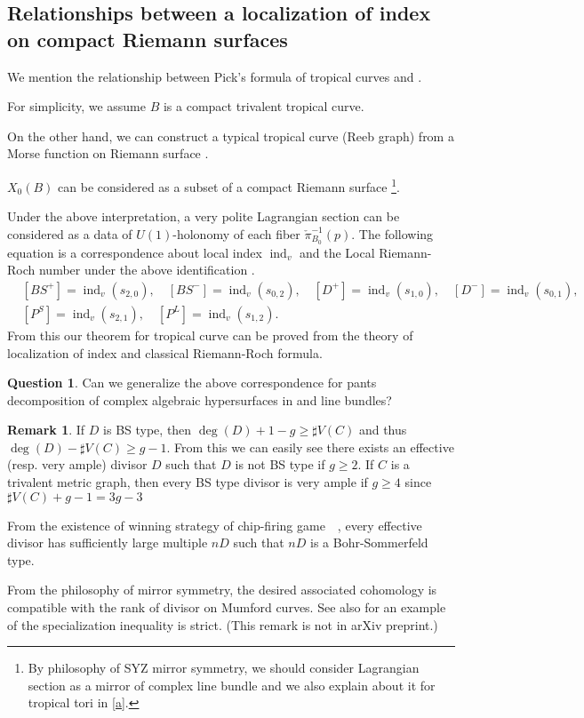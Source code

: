 \documentclass[a4paper,dvipdfmx,reqno,12pt]{amsart}
\theoremstyle{definition}
\newtheorem{Ques}[Thm]{Question}
\newtheorem{Rmk}[Thm]{Remark}
\newcommand{\opn}[1]{\operatorname{#1}}
\numberwithin{equation}{section}
\begin{document}
\subsection{Relationships between a localization of index on compact Riemann surfaces}
We mention the relationship between Pick's formula of tropical curves and
\cite[6]{MR2676658}.

For simplicity, we assume $B$ is a compact trivalent tropical curve.

On the other hand, we can construct a typical tropical curve
(Reeb graph) from a Morse function on Riemann surface
\cite[3.2.2]{kontsevichAffineStructuresNonArchimedean2006a}.

$X_0(B)$  can be considered as a subset of a compact Riemann surface
\footnote{By philosophy of SYZ mirror symmetry,
  we should consider Lagrangian section as a mirror of complex line bundle
  and we also explain about it for tropical tori in \cref{a}.
}.

Under the above interpretation, a very polite Lagrangian section can be considered as a data of $U(1)$-holonomy of each fiber $\check{\pi}_{B_0}^{-1}(p)$.
The following equation is a correspondence about local index $\opn{ind}_v$ and the Local Riemann-Roch number under the above identification \cite[Theorem 6.7]{MR2676658}.
\begin{align}
   & [BS^{+}]=\opn{ind}_v(s_{2,0}),
  \quad [BS^{-}]=\opn{ind}_v(s_{0,2}),
  \quad [D^{+}]=\opn{ind}_v(s_{1,0}),
  \quad [D^{-}]=\opn{ind}_v(s_{0,1}), \\
   & [P^{S}]=\opn{ind}_v(s_{2,1}),
  \quad [P^{L}]=\opn{ind}_v(s_{1,2}).
\end{align}
From this our theorem for tropical curve can be proved from the theory of localization of index and classical Riemann-Roch formula.
\begin{Ques}
  Can we generalize the above correspondence for pants decomposition of
  complex algebraic hypersurfaces in \cite{MR2079993} and line bundles?
\end{Ques}

\begin{Rmk}
  If $D$ is BS type, then $\opn{deg}(D)+1-g\geq \sharp V(C)$ and thus
  $\opn{deg}(D)-\sharp V(C)\geq g-1$.
  From this we can easily see there exists an effective (resp. very ample) divisor $D$ such that
  $D$ is not BS type if $g\geq 2$.
  If $C$ is a trivalent metric graph, then every BS type divisor is very ample if $g\geq 4$ since
  $\sharp V(C)+g-1=3g-3$

  From the existence of winning strategy of chip-firing game　\cite[Thereom 1.9]{MR2355607},
  every effective divisor has sufficiently large multiple $nD$ such that
  $nD$ is a Bohr-Sommerfeld type.



  From the philosophy of mirror symmetry, the desired associated cohomology is compatible with
  the rank of divisor on Mumford curves.
  See also \cite[Remark 2.9]{MR2448666} for an example of the specialization inequality is strict.
  (This remark is not in arXiv preprint.)
\end{Rmk}
\end{document}
